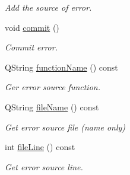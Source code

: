\begin{DoxyCompactItemize}
\begin{DoxyCompactList}\small\item\em Add the source of error. \end{DoxyCompactList}\item 
void \hyperlink{class_mdt_1_1_error_a1b4a57bd4177d2985abd62b6b49a43f8}{commit} ()
\begin{DoxyCompactList}\small\item\em Commit error. \end{DoxyCompactList}\item 
Q\+String \hyperlink{class_mdt_1_1_error_a5706a74669219d9672ee20414f805cab}{function\+Name} () const 
\begin{DoxyCompactList}\small\item\em Ger error source function. \end{DoxyCompactList}\item 
Q\+String \hyperlink{class_mdt_1_1_error_a5f7cdab03c2c0955693ace234039cd53}{file\+Name} () const 
\begin{DoxyCompactList}\small\item\em Get error source file (name only) \end{DoxyCompactList}\item 
int \hyperlink{class_mdt_1_1_error_a5b887edc31341eb23557905e7a2d69ae}{file\+Line} () const \hypertarget{class_mdt_1_1_error_a5b887edc31341eb23557905e7a2d69ae}{}\label{class_mdt_1_1_error_a5b887edc31341eb23557905e7a2d69ae}

\begin{DoxyCompactList}\small\item\em Get error source line. \end{DoxyCompactList}\end{DoxyCompactItemize}
